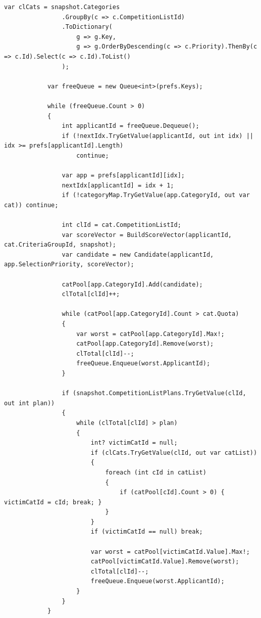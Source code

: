 \begin{lstlisting}[style=csharpstyle]
            var clCats = snapshot.Categories
                .GroupBy(c => c.CompetitionListId)
                .ToDictionary(
                    g => g.Key,
                    g => g.OrderByDescending(c => c.Priority).ThenBy(c => c.Id).Select(c => c.Id).ToList()
                );

            var freeQueue = new Queue<int>(prefs.Keys);

            while (freeQueue.Count > 0)
            {
                int applicantId = freeQueue.Dequeue();
                if (!nextIdx.TryGetValue(applicantId, out int idx) || idx >= prefs[applicantId].Length)
                    continue;

                var app = prefs[applicantId][idx];
                nextIdx[applicantId] = idx + 1;
                if (!categoryMap.TryGetValue(app.CategoryId, out var cat)) continue;

                int clId = cat.CompetitionListId;
                var scoreVector = BuildScoreVector(applicantId, cat.CriteriaGroupId, snapshot);
                var candidate = new Candidate(applicantId, app.SelectionPriority, scoreVector);

                catPool[app.CategoryId].Add(candidate);
                clTotal[clId]++;

                while (catPool[app.CategoryId].Count > cat.Quota)
                {
                    var worst = catPool[app.CategoryId].Max!;
                    catPool[app.CategoryId].Remove(worst);
                    clTotal[clId]--;
                    freeQueue.Enqueue(worst.ApplicantId);
                }

                if (snapshot.CompetitionListPlans.TryGetValue(clId, out int plan))
                {
                    while (clTotal[clId] > plan)
                    {
                        int? victimCatId = null;
                        if (clCats.TryGetValue(clId, out var catList))
                        {
                            foreach (int cId in catList)
                            {
                                if (catPool[cId].Count > 0) { victimCatId = cId; break; }
                            }
                        }
                        if (victimCatId == null) break;

                        var worst = catPool[victimCatId.Value].Max!;
                        catPool[victimCatId.Value].Remove(worst);
                        clTotal[clId]--;
                        freeQueue.Enqueue(worst.ApplicantId);
                    }
                }
            }


\end{lstlisting}
